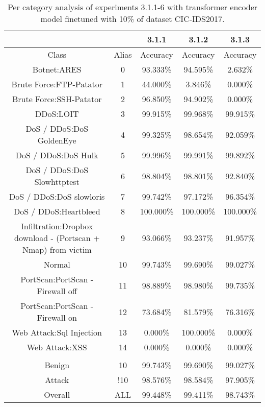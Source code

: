 \begin{table}[htb]
    \centering
    \begin{tabular}{@{}ccccc@{}}
        \toprule
         &  & 3.1.1 & 3.1.2 & 3.1.3 \\
        \midrule
        Class &  Alias &  Accuracy &  Accuracy &  Accuracy \\
        Botnet:ARES &  0 &  93.333\% &  94.595\% &  2.632\% \\
        Brute Force:FTP-Patator &  1 &  44.000\% &  3.846\% &  0.000\% \\
        Brute Force:SSH-Patator &  2 &  96.850\% &  94.902\% &  0.000\% \\
        DDoS:LOIT &  3 &  99.915\% &  99.968\% &  99.915\% \\
        DoS / DDoS:DoS GoldenEye &  4 &  99.325\% &  98.654\% &  92.059\% \\
        DoS / DDoS:DoS Hulk &  5 &  99.996\% &  99.991\% &  99.892\% \\
        DoS / DDoS:DoS Slowhttptest &  6 &  98.804\% &  98.801\% &  92.840\% \\
        DoS / DDoS:DoS slowloris &  7 &  99.742\% &  97.172\% &  96.354\% \\
        DoS / DDoS:Heartbleed &  8 &  100.000\% &  100.000\% &  100.000\% \\
        Infiltration:Dropbox download - (Portscan + Nmap) from victim &  9 &  93.066\% &  93.237\% &  91.957\% \\
        Normal &  10 &  99.743\% &  99.690\% &  99.027\% \\
        PortScan:PortScan - Firewall off &  11 &  98.889\% &  98.980\% &  99.735\% \\
        PortScan:PortScan - Firewall on &  12 &  73.684\% &  81.579\% &  76.316\% \\
        Web Attack:Sql Injection &  13 &  0.000\% &  100.000\% &  0.000\% \\
        Web Attack:XSS &  14 &  0.000\% &  0.000\% &  0.000\% \\
         \\
        Benign &  10 &  99.743\% &  99.690\% &  99.027\% \\
        Attack &  !10 &  98.576\% &  98.584\% &  97.905\% \\
        Overall &  ALL &  99.448\% &  99.411\% &  98.743\% \\
        \bottomrule
    \end{tabular}
    \caption{Per category analysis of experiments 3.1.1-6 with transformer encoder model finetuned with 10\% of dataset CIC-IDS2017.}
    \label{table:results:lstm:class_flows10}
\end{table}